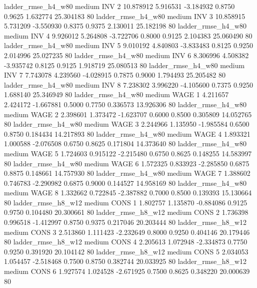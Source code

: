     ladder_rmse_h4_w80     medium      INV                 2 10.878912 5.916531 -3.184932 0.8750 0.9625  1.632774   25.304183 80
    ladder_rmse_h4_w80     medium      INV                 3 10.858915 5.731209 -3.550930 0.8375 0.9375  2.130011   25.182198 80
    ladder_rmse_h4_w80     medium      INV                 4  9.926012 5.264808 -3.722706 0.8000 0.9125  2.104383   25.060490 80
    ladder_rmse_h4_w80     medium      INV                 5  9.010192 4.840803 -3.833483 0.8125 0.9250  2.014996   25.027235 80
    ladder_rmse_h4_w80     medium      INV                 6  8.306996 4.508382 -3.935742 0.8125 0.9125  1.918719   25.080513 80
    ladder_rmse_h4_w80     medium      INV                 7  7.743078 4.239560 -4.028915 0.7875 0.9000  1.794493   25.205482 80
    ladder_rmse_h4_w80     medium      INV                 8  7.238302 3.996220 -4.105600 0.7375 0.9250  1.688140   25.346949 80
    ladder_rmse_h4_w80     medium     WAGE                 1  4.211657 2.424172 -1.667881 0.5000 0.7750  0.336573   13.926306 80
    ladder_rmse_h4_w80     medium     WAGE                 2  2.398601 1.373472 -1.623707 0.6000 0.8500  0.305809   14.052765 80
    ladder_rmse_h4_w80     medium     WAGE                 3  2.244966 1.135950 -1.985584 0.6500 0.8750  0.184434   14.217893 80
    ladder_rmse_h4_w80     medium     WAGE                 4  1.893321 1.000588 -2.076508 0.6750 0.8625  0.171804   14.373640 80
    ladder_rmse_h4_w80     medium     WAGE                 5  1.724603 0.915122 -2.215480 0.6750 0.8625  0.148255   14.583997 80
    ladder_rmse_h4_w80     medium     WAGE                 6  1.572325 0.833923 -2.285850 0.6875 0.8875  0.148661   14.757930 80
    ladder_rmse_h4_w80     medium     WAGE                 7  1.388602 0.746783 -2.290982 0.6875 0.9000  0.144527   14.958169 80
    ladder_rmse_h4_w80     medium     WAGE                 8  1.332662 0.722845 -2.387882 0.7000 0.8500  0.139393   15.130664 80
    ladder_rmse_h8_w12     medium     CONS                 1  1.802757 1.135870 -0.884086 0.9125 0.9750  0.104480   20.300661 80
    ladder_rmse_h8_w12     medium     CONS                 2  1.736398 0.996518 -1.412997 0.8750 0.9375  0.217046   20.203444 80
    ladder_rmse_h8_w12     medium     CONS                 3  2.513860 1.111423 -2.232649 0.8000 0.9250  0.404146   20.179446 80
    ladder_rmse_h8_w12     medium     CONS                 4  2.205613 1.072948 -2.334873 0.7750 0.9250  0.391920   20.104142 80
    ladder_rmse_h8_w12     medium     CONS                 5  2.034053 1.054457 -2.518468 0.7500 0.8750  0.382744   20.033925 80
    ladder_rmse_h8_w12     medium     CONS                 6  1.927574 1.024528 -2.671925 0.7500 0.8625  0.348220   20.000639 80
